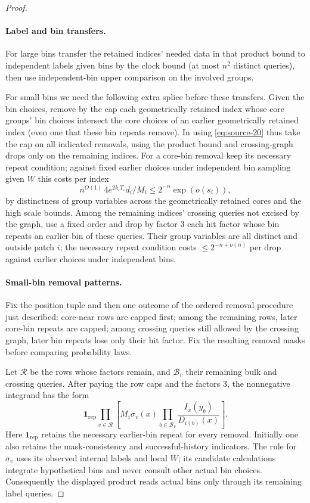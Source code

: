 \begin{proof}
\paragraph{Label and bin transfers.}
For large bins transfer the retained indices' needed data in that product bound to independent labels given bins by the clock bound (at most \(n^2\) distinct queries), then use independent-bin upper comparison on the involved groups.

For small bins we need the following extra splice before these transfers. Given the bin choices, remove by the cap each geometrically retained index whose core groups' bin choices intersect the core choices of an earlier geometrically retained index (even one that these bin repeats remove). In using \eqref{eq:source-20} thus take the cap on all indicated removals, using the product bound and crossing-graph drops only on the remaining indices. For a core-bin removal keep its necessary repeat condition; against fixed earlier choices under independent bin sampling given \(W\) this costs per index
\[
 n^{O(1)}\,4e^{2k_iT_i}d_i/M_i \le 2^{-n}\exp(o(s_i)),
\]
by distinctness of group variables across the geometrically retained cores and the high scale bounds. Among the remaining indices' crossing queries not excised by the graph, use a fixed order and drop by factor 3 each hit factor whose bin repeats an earlier bin of these queries. Their group variables are all distinct and outside patch \(i\); the necessary repeat condition costs \(\le2^{-n+o(n)}\) per drop against earlier choices under independent bins.

\paragraph{Small-bin removal patterns.}
Fix the position tuple and then one outcome of the ordered removal procedure just described: core-near rows are capped first; among the remaining rows, later core-bin repeats are capped; among crossing queries still allowed by the crossing graph, later bin repeats lose only their hit factor. Fix the resulting removal masks before comparing probability laws.

Let \(\mathcal R\) be the rows whose factors remain, and \(\mathcal B_v\) their remaining bulk and crossing queries. After paying the row caps and the factors 3, the nonnegative integrand has the form
\[
 \mathbf1_{\mathrm{rep}}
 \prod_{v\in\mathcal R}
   \left[M_i\sigma_v(x)
      \prod_{b\in\mathcal B_v}\frac{I_x(y_b)}{D_{i(b)}(x)}\right].
\]
Here \(\mathbf1_{\mathrm{rep}}\) retains the necessary earlier-bin repeat for every removal. Initially one also retains the mask-consistency and successful-history indicators. The rule for \(\sigma_v\) uses its observed internal labels and local \(W\); its candidate calculations integrate hypothetical bins and never consult other actual bin choices. Consequently the displayed product reads actual bins only through its remaining label queries.


\end{proof}

